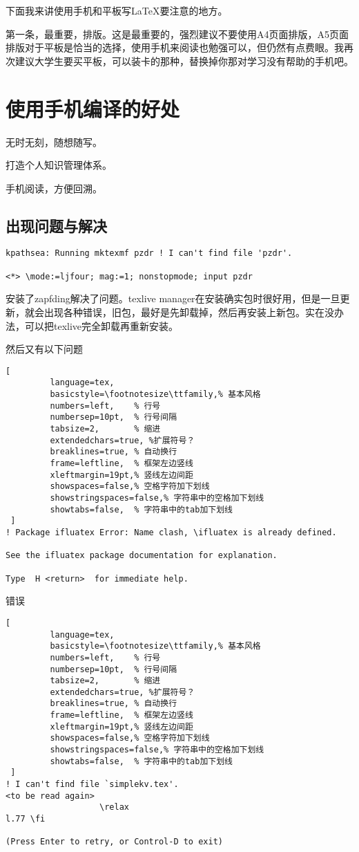下面我来讲使用手机和平板写\LaTeX 要注意的地方。

第一条，最重要，排版。这是最重要的，强烈建议不要使用A4页面排版，A5页面排版对于平板是恰当的选择，使用手机来阅读也勉强可以，但仍然有点费眼。我再次建议大学生要买平板，可以装卡的那种，替换掉你那对学习没有帮助的手机吧。


\section{使用手机编译的好处}

无时无刻，随想随写。

打造个人知识管理体系。

手机阅读，方便回溯。

\subsection{出现问题与解决}
\begin{lstlisting}[frame=leftline, xleftmargin=19pt]
kpathsea: Running mktexmf pzdr ! I can't find file 'pzdr'. 

<*> \mode:=ljfour; mag:=1; nonstopmode; input pzdr
\end{lstlisting}

安装了zapfding解决了问题。texlive manager在安装确实包时很好用，但是一旦更新，就会出现各种错误，旧包，最好是先卸载掉，然后再安装上新包。实在没办法，可以把texlive完全卸载再重新安装。

然后又有以下问题

\begin{lstlisting}[
         language=tex,
         basicstyle=\footnotesize\ttfamily,% 基本风格
         numbers=left,    % 行号
         numbersep=10pt,  % 行号间隔 
         tabsize=2,       % 缩进
         extendedchars=true, %扩展符号？
         breaklines=true, % 自动换行
         frame=leftline,  % 框架左边竖线
         xleftmargin=19pt,% 竖线左边间距
         showspaces=false,% 空格字符加下划线
         showstringspaces=false,% 字符串中的空格加下划线
         showtabs=false,  % 字符串中的tab加下划线
 ]
! Package ifluatex Error: Name clash, \ifluatex is already defined.

See the ifluatex package documentation for explanation.

Type  H <return>  for immediate help.
\end{lstlisting}

错误

\begin{lstlisting}[
         language=tex,
         basicstyle=\footnotesize\ttfamily,% 基本风格
         numbers=left,    % 行号
         numbersep=10pt,  % 行号间隔 
         tabsize=2,       % 缩进
         extendedchars=true, %扩展符号？
         breaklines=true, % 自动换行
         frame=leftline,  % 框架左边竖线
         xleftmargin=19pt,% 竖线左边间距
         showspaces=false,% 空格字符加下划线
         showstringspaces=false,% 字符串中的空格加下划线
         showtabs=false,  % 字符串中的tab加下划线
 ]
! I can't find file `simplekv.tex'.
<to be read again>
                   \relax
l.77 \fi

(Press Enter to retry, or Control-D to exit)
\end{lstlisting}


